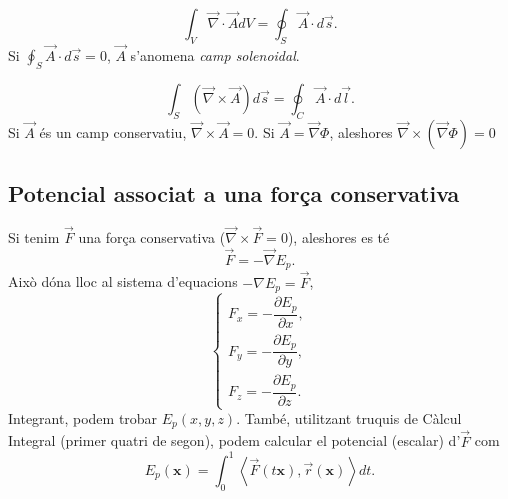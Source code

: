 \begin{teo}
    \[
    \int_V\vec{\nabla}\cdot\vec{A}dV=\oint_S\vec{A}\cdot d\vec{s}.
    \]
    Si $\oint_S\vec{A}\cdot d\vec{s}=0$, $\vec{A}$ s'anomena \textit{camp solenoidal}.
\end{teo}

\begin{teo}
	\[
	\int_S(\vec{\nabla}\times\vec{A})d\vec{s}=\oint_C\vec{A}\cdot d\vec{l}.\]
	Si $\vec{A}$ és un camp conservatiu, $\vec{\nabla}\times\vec{A}=0$. Si $\vec{A}=\vec{\nabla}\Phi$, aleshores $\vec{\nabla}\times(\vec{\nabla}\Phi)=0$
\end{teo}
\subsection{Potencial associat a una força conservativa}
Si tenim $\vec{F}$ una força conservativa ($\vec{\nabla}\times\vec{F}=0$), aleshores es té \[\vec{F}=-\vec{\nabla}E_p.\] Això dóna lloc al sistema d'equacions $-\nabla E_p=\vec{F}$,
\[
\begin{cases}
F_x=-\dfrac{\partial E_p}{\partial x},\\
F_y=-\dfrac{\partial E_p}{\partial y},\\
F_z=-\dfrac{\partial E_p}{\partial z}.
\end{cases}
\]
Integrant, podem trobar $E_p(x,y,z)$. També, utilitzant truquis de Càlcul Integral (primer quatri de segon), podem calcular el potencial (escalar) d'$\vec{F}$ com
\[
E_p(\mathbf{x})=\int_0^1\left<\vec{F}(t\mathbf{x}),\vec{r}(\mathbf{x})\right>dt.
\]